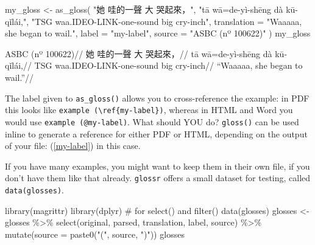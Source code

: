 \documentclass[
  letterpaper,
  DIV=11,
  numbers=noendperiod]{scrartcl}
\newenvironment{Shaded}{\begin{snugshade}}{\end{snugshade}}
\newcommand{\AttributeTok}[1]{\textcolor[rgb]{0.40,0.45,0.13}{#1}}
\newcommand{\CommentTok}[1]{\textcolor[rgb]{0.37,0.37,0.37}{#1}}
\newcommand{\FunctionTok}[1]{\textcolor[rgb]{0.28,0.35,0.67}{#1}}
\newcommand{\NormalTok}[1]{\textcolor[rgb]{0.00,0.23,0.31}{#1}}
\newcommand{\OtherTok}[1]{\textcolor[rgb]{0.00,0.23,0.31}{#1}}
\newcommand{\SpecialCharTok}[1]{\textcolor[rgb]{0.37,0.37,0.37}{#1}}
\newcommand{\StringTok}[1]{\textcolor[rgb]{0.13,0.47,0.30}{#1}}
\begin{document}
\begin{Shaded}
\begin{Highlighting}[]
\NormalTok{my\_gloss }\OtherTok{\textless{}{-}} \FunctionTok{as\_gloss}\NormalTok{(}
  \StringTok{"她 哇的一聲 大 哭起來，"}\NormalTok{,}
  \StringTok{"tā wā=de{-}yì{-}shēng dà kū{-}qǐlái,"}\NormalTok{,}
  \StringTok{"TSG waa.IDEO{-}LINK{-}one{-}sound big cry{-}inch"}\NormalTok{,}
  \AttributeTok{translation =} \StringTok{"Waaaaa, she began to wail."}\NormalTok{,}
  \AttributeTok{label =} \StringTok{"my{-}label"}\NormalTok{,}
  \AttributeTok{source =} \StringTok{"ASBC (nº 100622)"}
\NormalTok{)}
\NormalTok{my\_gloss}
\end{Highlighting}
\end{Shaded}


\ex\label{my-label} \begingl \glpreamble ASBC (nº 100622)// \gla 她
哇的一聲 大 哭起來，// \glb tā wā=de-yì-shēng dà kū-qǐlái,// \glc TSG
waa.IDEO-LINK-one-sound big cry-inch// \glft ``Waaaaa, she began to
wail.''// \endgl \xe

The label given to \texttt{as\_gloss()} allows you to cross-reference
the example: in PDF this looks like
\texttt{example\ (\textbackslash{}ref\{my-label\})}, whereas in HTML and
Word you would use \texttt{example\ (@my-label)}. What should YOU do?
\texttt{gloss()} can be used inline to generate a reference for either
PDF or HTML, depending on the output of your file: (\ref{my-label}) in
this case.

If you have many examples, you might want to keep them in their own
file, if you don't have them like that already. \texttt{glossr} offers a
small dataset for testing, called \texttt{data(glosses)}.

\begin{Shaded}
\begin{Highlighting}[]
\FunctionTok{library}\NormalTok{(magrittr)}
\FunctionTok{library}\NormalTok{(dplyr) }\CommentTok{\# for select() and filter()}
\FunctionTok{data}\NormalTok{(glosses)}
\NormalTok{glosses }\OtherTok{\textless{}{-}}\NormalTok{ glosses }\SpecialCharTok{\%\textgreater{}\%} 
  \FunctionTok{select}\NormalTok{(original, parsed, translation, label, source) }\SpecialCharTok{\%\textgreater{}\%} 
  \FunctionTok{mutate}\NormalTok{(}\AttributeTok{source =} \FunctionTok{paste0}\NormalTok{(}\StringTok{"("}\NormalTok{, source, }\StringTok{")"}\NormalTok{))}
\NormalTok{glosses}
\end{Highlighting}
\end{Shaded}
\end{document}
